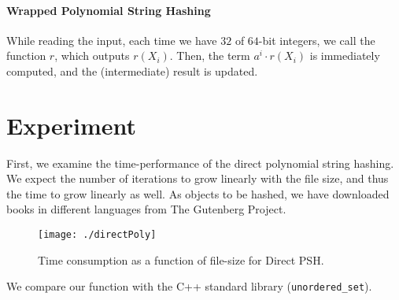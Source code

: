 \documentclass[]{article}
\newcommand{\funk}[1]{\small\texttt{#1}}
\newcommand{\cpp}{C+\!+\xspace}
\begin{document}
\paragraph{Wrapped Polynomial String Hashing}


While reading the input, each time we have $32$ of $64$-bit integers, we call the function $r$, which outputs $r(X_i)$. Then, the term $a^i \cdot r(X_i)$ is immediately computed, and the (intermediate) result is updated.





\section{Experiment}
First, we examine the time-performance of the direct polynomial string hashing. We expect the number of iterations to grow linearly with the file size, and thus the time to grow linearly as well.
As objects to be hashed, we have downloaded books in different languages from The Gutenberg Project. 

\begin{figure}[H]
\centering
\texttt{[image: ./directPoly]}
\caption{Time consumption as a function of file-size for Direct PSH.}
\label{fig:directPoly}
\end{figure}

We compare our function with the \cpp standard library (\funk{unordered\_set}). %
\end{document}
